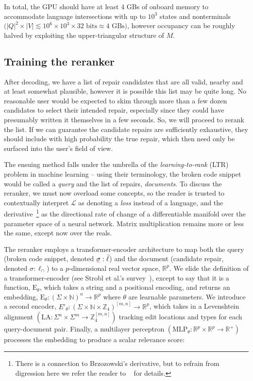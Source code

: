 \documentclass[sigplan,acmsmall,nonacm,screen]{acmart}\settopmatter{printfolios=false,printccs=false,printacmref=false}
\begin{document}
In total, the GPU should have at least 4 GBs of onboard memory to accommodate language intersections with up to $10^3$ states and nonterminals $\big(|Q|^2\times|V| \lesssim 10^6\times10^3\times 32 \text{ bits} \approx \text{4 GBs}\big)$, however occupancy can be roughly halved by exploiting the upper-triangular structure of $M$.

\clearpage\subsection{Training the reranker}

After decoding, we have a list of repair candidates that are all valid, nearby and at least somewhat plausible, however it is possible this list may be quite long. No reasonable user would be expected to skim through more than a few dozen candidates to select their intended repair, especially since they could have presumably written it themselves in a few seconds. So, we will proceed to rerank the list. If we can guarantee the candidate repairs are sufficiently exhaustive, they should include with high probability the true repair, which then need only be surfaced into the user's field of view.

The ensuing method falls under the umbrella of the \textit{learning-to-rank} (LTR) problem in machine learning -- using their terminology, the broken code snippet would be called a \textit{query} and the list of repairs, \textit{documents}. To discuss the reranker, we must now overload some concepts, so the reader is trusted to contextually interpret $\mathcal{L}$ as denoting a \textit{loss} instead of a language, and the derivative~\footnote{There is a connection to Brzozowski's derivative, but to refrain from digression here we refer the reader to ~\cite{elliott2019generalized} for details.} as the directional rate of change of a differentiable manifold over the parameter space of a neural network. Matrix multiplication remains more or less the same, except now over the reals.

The reranker employs a transformer-encoder architecture to map both the query (broken code snippet, denoted $\err\sigma: \bar\ell$) and the document (candidate repair, denoted $\sigma: \ell_\cap$) to a $p$-dimensional real vector space, $\mathbb{R}^p$. We elide the definition of a transformer-encoder (see Strobl et al.'s survey~\cite{strobl2024formal}), except to say that it is a function, $\text{E}_\theta$, which takes a string and a positional encoding, and returns an embedding, $\text{E}_\theta: (\Sigma\times \mathbb{N})^n \rightarrow \mathbb{R}^p$ where $\theta$ are learnable parameters. We introduce a second encoder, $E'_\theta: (\Sigma\times \mathbb{N} \times \mathbb{Z}_4)^{[m, n]} \rightarrow \mathbb{R}^p$, which takes in a Levenshtein alignment $(\text{LA}: \Sigma^n \times \Sigma^m \rightarrow \mathbb{Z}_4^{[m, n]})$ tracking edit locations and types for each query-document pair. Finally, a multilayer perceptron $(\text{MLP}_\theta: \mathbb{R}^p \times \mathbb{R}^p \rightarrow \mathbb{R}^+)$ processes the embedding to produce a scalar relevance score:
\end{document}
